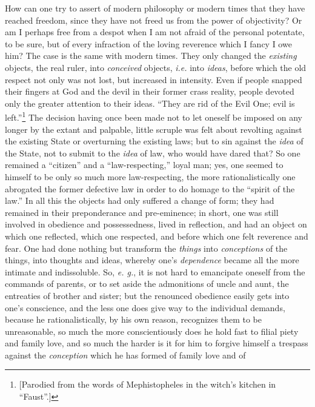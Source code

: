 \documentclass[12pt,a4paper]{book}
\begin{document}
How can one try to assert of modern philosophy or modern times that they have 
reached freedom, since they have not freed us from the power of objectivity? 
Or am I perhaps free from a despot when I am not afraid of the personal 
potentate, to be sure, but of every infraction of the loving reverence which I 
fancy I owe him? The case is the same with modern times. They only changed the 
\textit{existing} objects, the real ruler, into \textit{conceived} objects, 
\textit{i.e.} into \textit{ideas}, before which the old respect not only was 
not lost, but increased in intensity. Even if people snapped their fingers at 
God and the devil in their former crass reality, people devoted only the 
greater attention to their ideas. ``They are rid of the Evil One; evil is 
left.''\footnote{[Parodied from the words of Mephistopheles in the witch's 
kitchen in ``Faust''.]} The decision having once been made not to let 
oneself be imposed on any longer by the extant and palpable, little scruple 
was felt about revolting against the existing State or overturning the 
existing laws; but to sin against the \textit{idea} of the State, not to 
submit to the \textit{idea} of law, who would have dared that? So one remained 
a ``citizen'' and a ``law-respecting,'' loyal man; yes, one seemed to 
himself to be only so much more law-respecting, the more rationalistically one 
abrogated the former defective law in order to do homage to the ``spirit of 
the law.'' In all this the objects had only suffered a change of form; they 
had remained in their preponderance and pre-eminence; in short, one was still 
involved in obedience and possessedness, lived in reflection, and had an 
object on which one reflected, which one respected, and before which one felt 
reverence and fear. One had done nothing but transform the \textit{things} 
into \textit{conceptions} of the things, into thoughts and ideas, whereby 
one's \textit{dependence} became all the more intimate and indissoluble. So, 
\textit{e. g.}, it is not hard to emancipate oneself from the commands of 
parents, or to set aside the admonitions of uncle and aunt, the entreaties of 
brother and sister; but the renounced obedience easily gets into one's 
conscience, and the less one does give way to the individual demands, because 
he rationalistically, by his own reason, recognizes them to be unreasonable, 
so much the more conscientiously does he hold fast to filial piety and family 
love, and so much the harder is it for him to forgive himself a trespass 
against the \textit{conception} which he has formed of family love and of 
\end{document}
